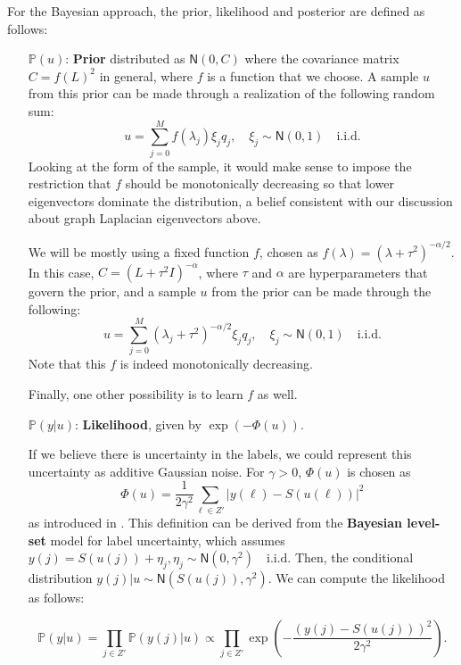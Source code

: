 \documentclass{siamart1116}
\begin{document}
For the Bayesian approach, the prior, likelihood and posterior are defined as follows:
\begin{itemize}
\item[$\mathbb{P}(u)$:] {\bf Prior} distributed as $\mathsf{N}(0,C)$ where the covariance matrix $C = f(L)^2$ in general, where $f$ is a function that we choose. A sample $u$ from this prior can be made through a realization of the following random sum:
\begin{equation}
\label{eqn:general_prior}
u = \sum_{j=0}^M f(\lambda_j)\xi_j q_j,\quad \xi_j\sim \mathsf{N}(0,1) \quad \text{i.i.d.}
\end{equation}
Looking at the form of the sample, it would make sense to impose the restriction that $f$ should be monotonically decreasing so that lower eigenvectors dominate the distribution, a belief consistent with our discussion about graph Laplacian eigenvectors above.


We will be mostly using a fixed function $f$, chosen as $f(\lambda) = (\lambda + \tau^2)^{-\alpha/2}$. In this case, $C = (L + \tau^2I)^{-\alpha}$, where $\tau$ and $\alpha$ are hyperparameters that govern the prior, and a sample $u$ from the prior can be made through the following:
\begin{equation}
\label{eqn:prior}
u = \sum_{j=0}^M (\lambda_j + \tau^2)^{-\alpha/2}\xi_j q_j,\quad \xi_j\sim \mathsf{N}(0,1) \quad \text{i.i.d.}
\end{equation}
Note that this $f$ is indeed monotonically decreasing.

Finally, one other possibility is to learn $f$ as well.

\item[$\mathbb{P}(y|u)$:] {\bf Likelihood}, given by $\exp(-\Phi(u))$.

If we believe there is uncertainty in the labels, we could represent this uncertainty as additive Gaussian noise. For $\gamma > 0$, $\Phi(u)$ is chosen as
\begin{equation}
\label{eqn:likelihood}
\Phi(u) = \displaystyle \frac{1}{2\gamma^2}\sum_{\ell\in Z'}|y(\ell)-S(u(\ell))|^2
\end{equation}
as introduced in \cite{BLS}. This definition can be derived from the {\bf Bayesian level-set} model for label uncertainty, which assumes $y(j) = S(u(j)) + \eta_j, \eta_j \sim \mathsf{N}(0,\gamma^2) \quad \text{i.i.d.}$ Then, the conditional distribution $y(j) | u \sim \mathsf{N}(S(u(j)),\gamma^2)$. We can compute the likelihood as follows:

\[ \mathbb{P}(y|u) = \prod_{j\in Z'} \mathbb{P}(y(j)|u) \propto \prod_{j\in Z'} \exp\left(-\frac{(y(j)-S(u(j)))^2} {2\gamma^2}\right).\]


\end{itemize}
\end{document}
